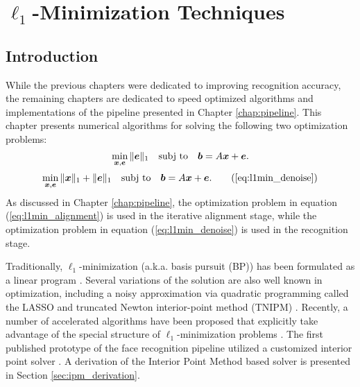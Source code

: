 \chapter{$\ell_1$-Minimization Techniques}
\label{chap:minimization}

\section{Introduction}
While the previous chapters were dedicated to improving recognition accuracy,
the remaining chapters are dedicated to speed optimized
algorithms and implementations of the pipeline presented in Chapter
\ref{chap:pipeline}.  This chapter presents numerical algorithms for solving the following
two optimization problems:
\begin{equation}
\min_{{\boldsymbol{x}}, {\boldsymbol{e}}} \|{\boldsymbol{e}}\|_1 \quad \textup{subj to} \quad \boldsymbol{b} = A {\boldsymbol{x}} + {\boldsymbol{e}}.
\label{eq:l1min_alignment}
\end{equation}
\begin{equation}
\min_{\xx, \ee} \| \xx \|_1 + \|\ee\|_1 \quad \subj \quad \bb = A \xx + \ee.
\tag{\ref{eq:l1min_denoise}}
\end{equation}
As discussed in Chapter \ref{chap:pipeline}, the optimization problem in equation
(\ref{eq:l1min_alignment}) is used in the iterative alignment stage, while the optimization
problem in equation (\ref{eq:l1min_denoise}) is used in the recognition stage.

Traditionally, $\ell_1$-minimization (a.k.a.
basis pursuit (BP)) has been formulated as a linear program
\cite{ChenS2001-SIAM}. 
Several variations of the solution are also well known
in optimization, including a noisy approximation via quadratic programming
called the LASSO \cite{TibshiraniR1996} and truncated Newton interior-point
method (TNIPM) \cite{KimS2007}.
Recently, a number of accelerated algorithms have been proposed that
explicitly take advantage of the special structure of $\ell_1$-minimization
problems \cite{LorisI2009,YangA2010-ICIP}. 
The first published prototype of the face recognition pipeline utilized a customized
interior point solver \cite{WagnerA2009-CVPR}.  A derivation of the Interior Point
Method based solver is presented in Section \ref{sec:ipm_derivation}.

